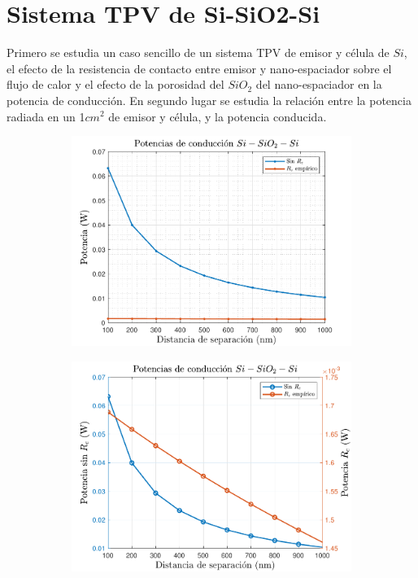 \section{Sistema TPV de Si-SiO2-Si}
Primero se estudia un caso sencillo de un sistema TPV de emisor y célula de $Si$, el efecto de la resistencia de contacto entre emisor y nano-espaciador sobre el flujo de calor y el efecto de la porosidad del $SiO_2$ del nano-espaciador en la potencia de conducción. En segundo lugar se estudia la relación entre la potencia radiada en un 1$cm^2$ de emisor y célula, y la potencia conducida.\\
\begin{figure}[H]
	\centering
	\begin{subfigure}[b]{0.49\textwidth}
		\centering
		\includegraphics[width=1.0\textwidth]{figuras/Resultados/conduccion/pdf/Prc_SiSiO2Si.pdf}
		\caption{ }
		\label{fig:Prc_SiSiO2Si}
	\end{subfigure}
	\begin{subfigure}[b]{0.49\textwidth}
		\centering
		\includegraphics[width=1.0\textwidth]{figuras/Resultados/conduccion/pdf/Prc2_SiSiO2Si.pdf}

\end{subfigure}
\end{figure}
